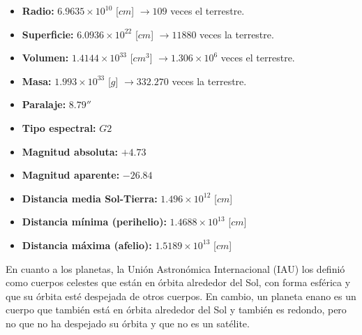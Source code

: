 \documentclass[10pt,a4paper]{article}
\begin{document}
\begin{itemize}
\item \textbf{Radio:} $6.9635 \times 10^{10}$ [$cm$] $\rightarrow 109$ veces el terrestre.
\item \textbf{Superficie:} $6.0936 \times 10^{22}$ [$cm$] $\rightarrow 11880$ veces la terrestre.  
\item \textbf{Volumen:} $1.4144 \times 10^{33}$ [$cm^{3}$] $\rightarrow 1.306 \times 10^{6}$ veces el terrestre.
\item \textbf{Masa:} $1.993 \times 10^{33}$ [$g$] $\rightarrow 332.270$ veces la terrestre.
\item \textbf{Paralaje:} $8.79''$
\item \textbf{Tipo espectral:} $G2$
\item \textbf{Magnitud absoluta:} $+4.73$
\item \textbf{Magnitud aparente:} $-26.84$
\item \textbf{Distancia media Sol-Tierra:} $1.496 \times 10^{12}$ [$cm$]
\item \textbf{Distancia mínima (perihelio):} $1.4688 \times 10^{13}$ [$cm$]
\item \textbf{Distancia máxima (afelio):} $1.5189 \times 10^{13}$ [$cm$]
\end{itemize}

En cuanto a los planetas, la Unión Astronómica Internacional (IAU) los definió como cuerpos celestes que están en órbita alrededor del Sol, con forma esférica y que su órbita esté despejada de otros cuerpos. En cambio, un planeta enano es un cuerpo que también está en órbita alrededor del Sol y también es redondo, pero no que no ha despejado su órbita y que no es un satélite.
\end{document}
